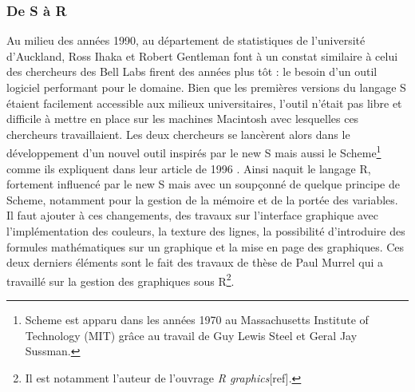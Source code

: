 \documentclass[]{article}
\begin{document}
\hypertarget{de-s-uxe0-r}{%
\subsubsection{De S à R}\label{de-s-uxe0-r}}

Au milieu des années 1990, au département de statistiques de l'université d'Auckland, Ross Ihaka et Robert Gentleman font à un constat similaire à celui des chercheurs des Bell Labs firent des années plus tôt : le besoin d'un outil logiciel performant pour le domaine. Bien que les premières versions du langage S étaient facilement accessible aux milieux universitaires, l'outil n'était pas libre et difficile à mettre en place sur les machines Macintosh avec lesquelles ces chercheurs travaillaient. Les deux chercheurs se lancèrent alors dans le développement d'un nouvel outil inspirés par le new S mais aussi le Scheme\footnote{Scheme est apparu dans les années 1970 au Massachusetts Institute of Technology (MIT) grâce au travail de Guy Lewis Steel et Geral Jay Sussman.} comme ils expliquent dans leur article de 1996 \citep{ihaka_r_1996}. Ainsi naquit le langage R, fortement influencé par le new S mais avec un soupçonné de quelque principe de Scheme, notamment pour la gestion de la mémoire et de la portée des variables. Il faut ajouter à ces changements, des travaux sur l'interface graphique avec l'implémentation des couleurs, la texture des lignes, la possibilité d'introduire des formules mathématiques sur un graphique et la mise en page des graphiques. Ces deux derniers éléments sont le fait des travaux de thèse de Paul Murrel qui a travaillé sur la gestion des graphiques sous R\footnote{Il est notamment l'auteur de l'ouvrage \emph{R graphics}{[}ref{]}.}.
\end{document}
